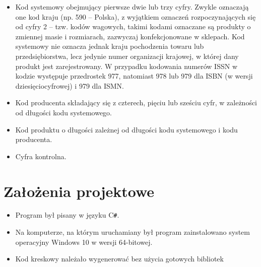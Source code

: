 \documentclass[12pt,a4paper,notitlepage]{report}
\begin{document}
\begin{itemize}
\item Kod systemowy obejmujący pierwsze dwie lub trzy cyfry. Zwykle oznaczają one kod kraju (np. 590 – Polska), z wyjątkiem oznaczeń rozpoczynających się od cyfry 2 – tzw. kodów wagowych, takimi kodami oznaczane są produkty o zmiennej masie i rozmiarach, zazwyczaj konfekcjonowane w sklepach. Kod systemowy nie oznacza jednak kraju pochodzenia towaru lub przedsiębiorstwa, lecz jedynie numer organizacji krajowej, w której dany produkt jest zarejestrowany. W przypadku kodowania numerów ISSN w kodzie występuje przedrostek 977, natomiast 978 lub 979 dla ISBN (w wersji dziesięciocyfrowej) i 979 dla ISMN.
\item Kod producenta składający się z czterech, pięciu lub sześciu cyfr, w zależności od długości kodu systemowego.
\item Kod produktu o długości zależnej od długości kodu systemowego i kodu producenta.
\item Cyfra kontrolna.
\end{itemize}
\section{Założenia projektowe}
\begin{itemize}
\item Program był pisany w języku C\texttt{\#}.
\item Na komputerze, na którym uruchamiany był program zainstalowano system operacyjny Windows 10 w wersji 64-bitowej.
\item Kod kreskowy należało wygenerować bez użycia gotowych bibliotek
\end{itemize}
\end{document}
